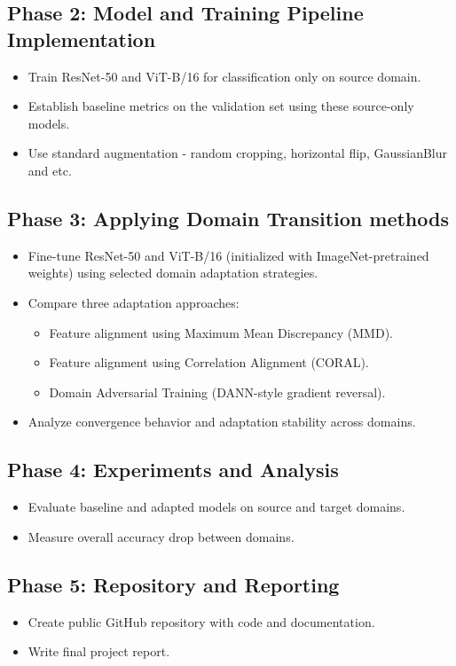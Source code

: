 \documentclass[a4paper,12pt]{extarticle}
\begin{document}
\subsection{Phase 2: Model and Training Pipeline Implementation}
\begin{itemize}
	\item Train ResNet-50 and ViT-B/16 for classification only on source domain.
	\item Establish baseline metrics on the validation set using these source-only models.
	\item Use standard augmentation - random cropping, horizontal flip, GaussianBlur and etc.
\end{itemize}

\subsection{Phase 3: Applying Domain Transition methods}
\begin{itemize}
	\item Fine-tune ResNet-50 and ViT-B/16 (initialized with ImageNet-pretrained weights) using selected domain adaptation
	      strategies.
	\item Compare three adaptation approaches:
	      \begin{itemize}
		      \item Feature alignment using Maximum Mean Discrepancy (MMD).
		      \item Feature alignment using Correlation Alignment (CORAL).
		      \item Domain Adversarial Training (DANN-style gradient reversal).
	      \end{itemize}
	\item Analyze convergence behavior and adaptation stability across domains.
\end{itemize}

\subsection{Phase 4: Experiments and Analysis}
\begin{itemize}
	\item Evaluate baseline and adapted models on source and target domains.
	\item Measure overall accuracy drop between domains.
\end{itemize}

\subsection{Phase 5: Repository and Reporting}
\begin{itemize}
	\item Create public GitHub repository with code and documentation.
	\item Write final project report.
\end{itemize}
\end{document}
